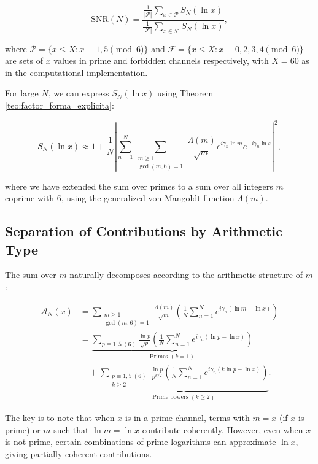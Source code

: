 \documentclass[12pt, a4paper]{article}
\theoremstyle{plain}
\theoremstyle{definition}
\theoremstyle{remark}
\begin{document}
\[
\mathrm{SNR}(N) = \frac{\displaystyle \frac{1}{|\mathcal{P}|} \sum_{x \in \mathcal{P}} S_N(\ln x)}{\displaystyle \frac{1}{|\mathcal{F}|} \sum_{x \in \mathcal{F}} S_N(\ln x)},
\]

where $\mathcal{P} = \{x \leq X : x \equiv 1,5 \pmod{6}\}$ and $\mathcal{F} = \{x \leq X : x \equiv 0,2,3,4 \pmod{6}\}$ are sets of $x$ values in prime and forbidden channels respectively, with $X = 60$ as in the computational implementation.

For large $N$, we can express $S_N(\ln x)$ using Theorem \ref{teo:factor_forma_explicita}:

\[
S_N(\ln x) \approx 1 + \frac{1}{N} \left| \sum_{n=1}^N \sum_{\substack{m \geq 1 \\ \gcd(m,6)=1}} \frac{\Lambda(m)}{\sqrt{m}} e^{i\gamma_n \ln m} e^{-i\gamma_n \ln x} \right|^2,
\]

where we have extended the sum over primes to a sum over all integers $m$ coprime with 6, using the generalized von Mangoldt function $\Lambda(m)$.

\subsection{Separation of Contributions by Arithmetic Type}

The sum over $m$ naturally decomposes according to the arithmetic structure of $m$:

\begin{align*}
\mathcal{A}_N(x) &= \sum_{\substack{m \geq 1 \\ \gcd(m,6)=1}} \frac{\Lambda(m)}{\sqrt{m}} \left( \frac{1}{N} \sum_{n=1}^N e^{i\gamma_n (\ln m - \ln x)} \right) \\
&= \underbrace{\sum_{p \equiv 1,5 \ (6)} \frac{\ln p}{\sqrt{p}} \left( \frac{1}{N} \sum_{n=1}^N e^{i\gamma_n (\ln p - \ln x)} \right)}_{\text{Primes }(k=1)} \\
&\quad + \underbrace{\sum_{\substack{p \equiv 1,5 \ (6) \\ k \geq 2}} \frac{\ln p}{p^{k/2}} \left( \frac{1}{N} \sum_{n=1}^N e^{i\gamma_n (k\ln p - \ln x)} \right)}_{\text{Prime powers }(k \geq 2)}.
\end{align*}

The key is to note that when $x$ is in a prime channel, terms with $m = x$ (if $x$ is prime) or $m$ such that $\ln m = \ln x$ contribute coherently. However, even when $x$ is not prime, certain combinations of prime logarithms can approximate $\ln x$, giving partially coherent contributions.
\end{document}
